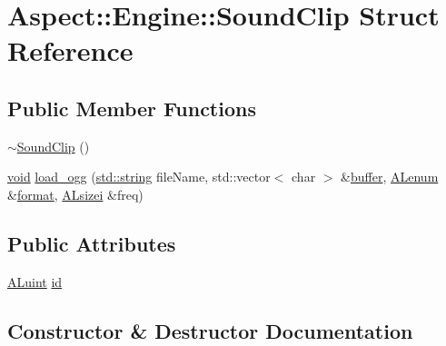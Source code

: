 \hypertarget{struct_aspect_1_1_engine_1_1_sound_clip}{}\section{Aspect\+:\+:Engine\+:\+:Sound\+Clip Struct Reference}
\label{struct_aspect_1_1_engine_1_1_sound_clip}
\subsection*{Public Member Functions}
\begin{DoxyCompactItemize}
\item 
\mbox{\hyperlink{struct_aspect_1_1_engine_1_1_sound_clip_ab30bd8d849c59adb6356c5a6222b0d25}{$\sim$\+Sound\+Clip}} ()
\item 
\mbox{\hyperlink{_s_d_l__opengles2__gl2ext_8h_ae5d8fa23ad07c48bb609509eae494c95}{void}} \mbox{\hyperlink{struct_aspect_1_1_engine_1_1_sound_clip_afe23f1aea045236c4ced62ff144e3fbe}{load\+\_\+ogg}} (\mbox{\hyperlink{_s_d_l__opengl__glext_8h_ae84541b4f3d8e1ea24ec0f466a8c568b}{std\+::string}} file\+Name, std\+::vector$<$ char $>$ \&\mbox{\hyperlink{_s_d_l__opengl__glext_8h_a76461e97a098d2c9ae20ac193d3825ae}{buffer}}, \mbox{\hyperlink{al_8h_a715098c13211f3570a9288a27f87fdfa}{A\+Lenum}} \&\mbox{\hyperlink{_s_d_l__audio_8h_a71a65ffd977afe9c3fef116a5bc9ee27}{format}}, \mbox{\hyperlink{al_8h_ab966c4d5d554fee3ae4e5c7774e83c7e}{A\+Lsizei}} \&freq)
\end{DoxyCompactItemize}
\subsection*{Public Attributes}
\begin{DoxyCompactItemize}
\item 
\mbox{\hyperlink{al_8h_ae0292edc5c1c47db9accee3f49933e6f}{A\+Luint}} \mbox{\hyperlink{struct_aspect_1_1_engine_1_1_sound_clip_a4f13ca26dcad6392765f5c170cf1031d}{id}}
\end{DoxyCompactItemize}


\subsection{Constructor \& Destructor Documentation}
\mbox{\label{struct_aspect_1_1_engine_1_1_sound_clip_ab30bd8d849c59adb6356c5a6222b0d25}} 
